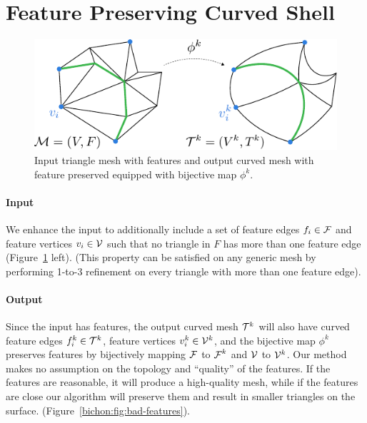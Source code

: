 \section{Feature Preserving Curved Shell}\label{cumin:sec:features-pres}


\begin{figure}
    \centering
    \includegraphics[width=.75\linewidth]{curve_meshing_in_shell_tex/figs/illustrations/input-output-feature.pdf}
    \caption{Input triangle mesh with features and output curved mesh with feature preserved equipped with bijective map $\phi^k$.}
    \label{bichon:fig:input-output-feature}
\end{figure}

\paragraph{Input}
We enhance the input to additionally include a set of feature edges $f_i\in\operatorname{\mathcal{F}}$ and feature vertices $v_i\in\mathcal{V}$ such that no triangle in $F$ has more than one feature edge (Figure~\ref{bichon:fig:input-output-feature} left). (This property can be satisfied on any generic mesh by performing 1-to-3 refinement on every triangle with more than one feature edge). 

\paragraph{Output}
Since the input has features, the output curved mesh $\mathcal{T}^k$ will also have curved {feature} edges $f_i^k\in\mathcal{T}^k$, feature vertices $v_i^k\in\mathcal{V}^k$, and the bijective map $\phi^k$ preserves features by bijectively mapping $\operatorname{\mathcal{F}}$ to $\operatorname{\mathcal{F}}^k$ and $\mathcal{V}$ to $\mathcal{V}^k$. Our {method} makes no assumption on the topology and ``quality'' of the features. If the features are reasonable, it will produce {a} high-quality mesh, while if the features are close our algorithm will preserve them and result in smaller triangles on the surface. (Figure~\ref{bichon:fig:bad-features}).

